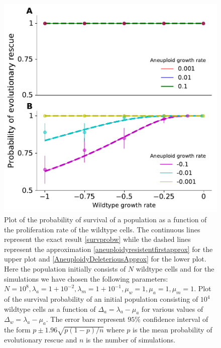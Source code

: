 \documentclass[12pt]{extarticle}
\begin{document}
\begin{figure}[!t]
 \vspace*{1\baselineskip}
\includegraphics[width=1\textwidth]{Figures/CombinedSubplotLargePop.pdf}
\caption{Plot of the probability of survival of a population as a function of the proliferation rate of the wildtype cells. The continuous lines represent the exact result \eqref{survprobw} while the dashed lines represent the approximation \eqref{aneuploidyresistentfirstapprox} for the upper plot and \eqref{AneuploidyDeleteriousApprox} for the lower plot.  Here the population initially consists of $N$ wildtype cells and for the simulations we have chosen the following parameters: $N=10^8, \lambda_a=1+10^{-2},\lambda_m=1+10^{-1},\mu_w=1,\mu_a=1,\mu_m=1$. Plot of the survival probability of an initial population consisting of $10^{4}$ wildtype cells as a function of $\Delta_a=\lambda_a-\mu_a$ for various values of $\Delta_w=\lambda_a-\mu_a$. The error bars represent $95\%$ confidence interval of the form $p\pm1.96\sqrt{p\left(1-p\right)/n}$ where $p$ is the mean probability of evolutionary rescue and $n$ is the number of simulations.}
\label{SurvPlotLargeN}
\end{figure}
\end{document}
